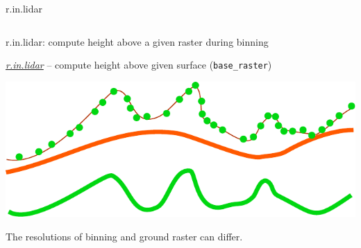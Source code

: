 \documentclass[xcolor={dvipsnames,usenames},beamer,aspectratio=169]{beamer}
\newcommand{\gmodule}[1]{\href{http://grass.osgeo.org/grass71/manuals/#1.html}{\emph{#1}}}
\begin{document}
\begin{frame}{r.in.lidar}
\begin{columns}
\begin{column}{0.45\textwidth}

\end{column}
\end{columns}

\end{frame}

\begin{frame}{r.in.lidar: compute height above a given raster during binning}

\gmodule{r.in.lidar} -- compute height above given surface (\texttt{base\_raster})

\begin{center}
\includegraphics[height=0.5\textheight]{images/features/base_raster}
\end{center}

The resolutions of binning and ground raster can differ.

\end{frame}

\end{document}
